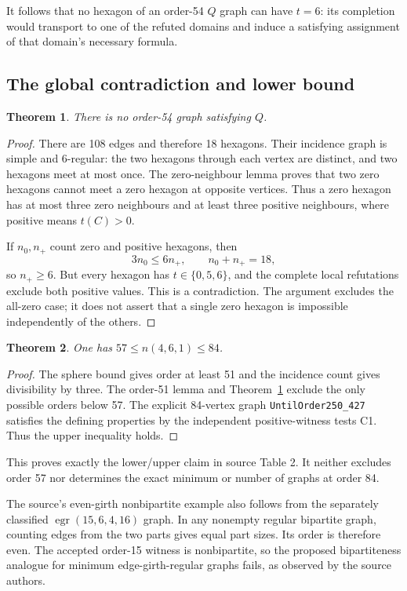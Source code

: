\documentclass[11pt,a4paper]{article}
\newtheorem{theorem}{Theorem}
\newcommand{\egr}{\operatorname{egr}}
\begin{document}
It follows that no hexagon of an order-54 $Q$ graph can have $t=6$:
its completion would transport to one of the refuted domains and induce
a satisfying assignment of that domain's necessary formula.

\subsection{The global contradiction and lower bound}
\begin{theorem}\label{thm:54}
There is no order-54 graph satisfying $Q$.
\end{theorem}
\begin{proof}
There are 108 edges and therefore 18 hexagons. Their incidence graph
is simple and 6-regular: the two hexagons through each vertex are
distinct, and two hexagons meet at most once. The zero-neighbour lemma
\cite{order54} proves that two zero hexagons cannot meet a zero hexagon
at opposite vertices. Thus a zero hexagon has at most three zero
neighbours and at least three positive neighbours, where positive means
$t(C)>0$.

If $n_0,n_+$ count zero and positive hexagons, then
\[
                   3n_0\le6n_+,\qquad n_0+n_+=18,
\]
so $n_+\ge6$. But every hexagon has $t\in\{0,5,6\}$, and the complete
local refutations exclude both positive values. This is a contradiction.
The argument excludes the all-zero case; it does not assert that a
single zero hexagon is impossible independently of the others.
\end{proof}

\begin{theorem}\label{thm:57}
One has $57\le n(4,6,1)\le84$.
\end{theorem}
\begin{proof}
The sphere bound gives order at least 51 and the incidence count gives
divisibility by three. The order-51 lemma and Theorem~\ref{thm:54}
exclude the only possible orders below 57. The explicit 84-vertex graph
\texttt{UntilOrder250\_427} satisfies the defining properties by the
independent positive-witness tests C1. Thus the upper inequality holds.
\end{proof}
This proves exactly the lower/upper claim in source Table 2. It neither
excludes order 57 nor determines the exact minimum or number of graphs
at order 84.

The source's even-girth nonbipartite example also follows from the
separately classified $\egr(15,6,4,16)$ graph. In any nonempty regular
bipartite graph, counting edges from the two parts gives equal part
sizes. Its order is therefore even. The accepted order-15 witness is
nonbipartite, so the proposed bipartiteness analogue for minimum
edge-girth-regular graphs fails, as observed by the source authors.
\end{document}
